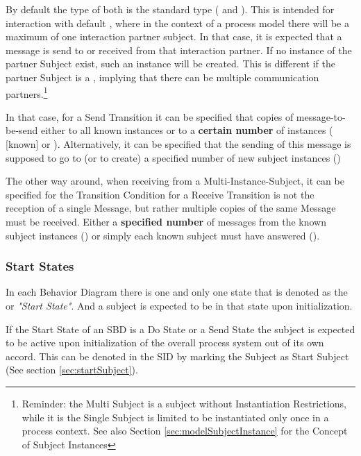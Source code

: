 By default the type of both is the standard type (  and ). This is intended for interaction with default , where in the context of a process model there will be a maximum of one interaction partner subject. In that case, it is expected that a message is send to or received from that interaction partner. If no instance of the partner Subject exist, such an instance will be created. This is different if the partner Subject is a , implying that there can be multiple communication partners.\footnote{Reminder: the Multi Subject is a subject without Instantiation Restrictions, while it is the Single Subject is limited to be instantiated only once in a process context. See also Section \ref{sec:modelSubjectInstance} for the Concept of Subject Instances} 

In that case, for a Send Transition it can be specified that copies of message-to-be-send either to all known instances or to a \textbf{certain number} of instances  ( [known] or ). Alternatively, it can be specified that the sending of this message is supposed to go to (or to create) a specified number of new subject instances ()

The other way around, when receiving from a Multi-Instance-Subject, it can be specified for the Transition Condition for a Receive Transition is not the reception of a single Message, but rather multiple copies of the same Message must be received. Either a \textbf{specified number} of messages from the known subject instances () or simply each known subject must have answered ().


\subsubsection{Start States}
\label{sec:startStates}

In each Behavior Diagram there is one and only one state that is denoted as the  or \textit{"Start State"}. And a subject is expected to be in that state upon initialization. 

If the Start State of an SBD is a Do State or a Send State the subject is expected to be active upon initialization of the overall process system out of its own accord. This can be denoted in the SID by marking the Subject as Start Subject (See section \ref{sec:startSubject}).

